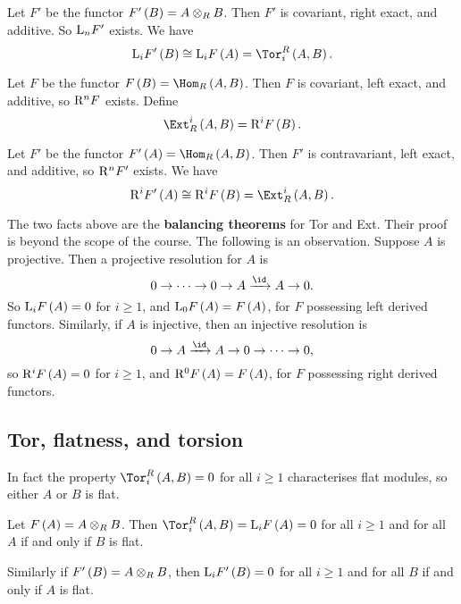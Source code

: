 \begin{fact*}
Let $ F' $ be the functor $ F'\br{B} = A \otimes_R B $. Then $ F' $ is covariant, right exact, and additive. So $ \mathrm{L}_nF' $ exists. We have
$$ \L_iF'\br{B} \cong \L_iF\br{A} = \Tor_i^R\br{A, B}. $$
\end{fact*}

\begin{definition}
Let $ F $ be the functor $ F\br{B} = \Hom_R\br{A, B} $. Then $ F $ is covariant, left exact, and additive, so $ \mathrm{R}^nF $ exists. Define
$$ \Ext_R^i\br{A, B} = \R^iF\br{B}. $$
\end{definition}

\begin{fact*}
Let $ F' $ be the functor $ F'\br{A} = \Hom_R\br{A, B} $. Then $ F' $ is contravariant, left exact, and additive, so $ \mathrm{R}^nF' $ exists. We have
$$ \R^iF'\br{A} \cong \R^iF\br{B} = \Ext_R^i\br{A, B}. $$
\end{fact*}

The two facts above are the \textbf{balancing theorems} for Tor and Ext. Their proof is beyond the scope of the course. The following is an observation. Suppose $ A $ is projective. Then a projective resolution for $ A $ is
$$ 0 \to \dots \to 0 \to A \xrightarrow{\id} A \to 0. $$
So $ \L_iF\br{A} = 0 $ for $ i \ge 1 $, and $ \L_0F\br{A} = F\br{A} $, for $ F $ possessing left derived functors. Similarly, if $ A $ is injective, then an injective resolution is
$$ 0 \to A \xrightarrow{\id} A \to 0 \to \dots \to 0, $$
so $ \R^iF\br{A} = 0 $ for $ i \ge 1 $, and $ \R^0F\br{A} = F\br{A} $, for $ F $ possessing right derived functors.

\subsection{Tor, flatness, and torsion}

In fact the property $ \Tor_i^R\br{A, B} = 0 $ for all $ i \ge 1 $ characterises flat modules, so either $ A $ or $ B $ is flat.

\begin{proposition}
Let $ F\br{A} = A \otimes_R B $. Then $ \Tor_i^R\br{A, B} = \L_iF\br{A} = 0 $ for all $ i \ge 1 $ and for all $ A $ if and only if $ B $ is flat.
\end{proposition}

Similarly if $ F'\br{B} = A \otimes_R B $, then $ \L_iF'\br{B} = 0 $ for all $ i \ge 1 $ and for all $ B $ if and only if $ A $ is flat.


